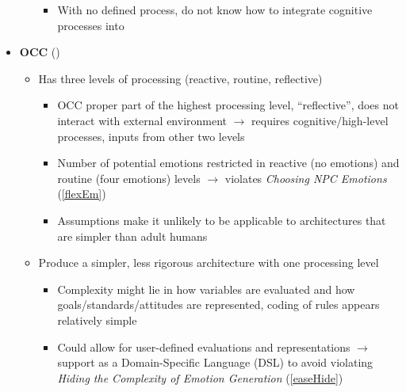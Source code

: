 \begin{itemize}
\begin{itemize}
\begin{itemize}
            \item With no defined process, do not know how to integrate
            cognitive processes into \progname{}
        \end{itemize}
    \end{itemize}

    \item \textbf{OCC} (\good)
    \begin{itemize}
        \item Has three levels of processing (reactive, routine,
        reflective)~\citep[p.~175--177, 179]{ortony2005affect}
        \begin{itemize}
            \item OCC proper part of the highest processing level,
            ``reflective'', does not interact with external environment
            $\rightarrow$ requires cognitive/high-level
            processes, inputs from other two levels

            \item Number of potential emotions restricted in reactive (no
            emotions) and routine (four emotions) levels $\rightarrow$ violates
            \textit{Choosing NPC Emotions} (\ref{flexEm})

            \item Assumptions make it unlikely to be applicable to
            architectures that are simpler than adult
            humans~\citep[p.~220]{sloman2005architectural}
        \end{itemize}

        \item Produce a simpler, less rigorous architecture with one processing
        level
        \begin{itemize}
            \item Complexity might lie in how variables are evaluated and how
            goals/standards/attitudes are represented, coding of rules appears
            relatively simple~\citep[p.~182--188]{occ}

            \item Could allow for user-defined evaluations and representations
            $\rightarrow$ support as a Domain-Specific Language (DSL) to avoid
            violating \textit{Hiding the Complexity of Emotion Generation}
            (\ref{easeHide})
        \end{itemize}
    \end{itemize}


\end{itemize}
